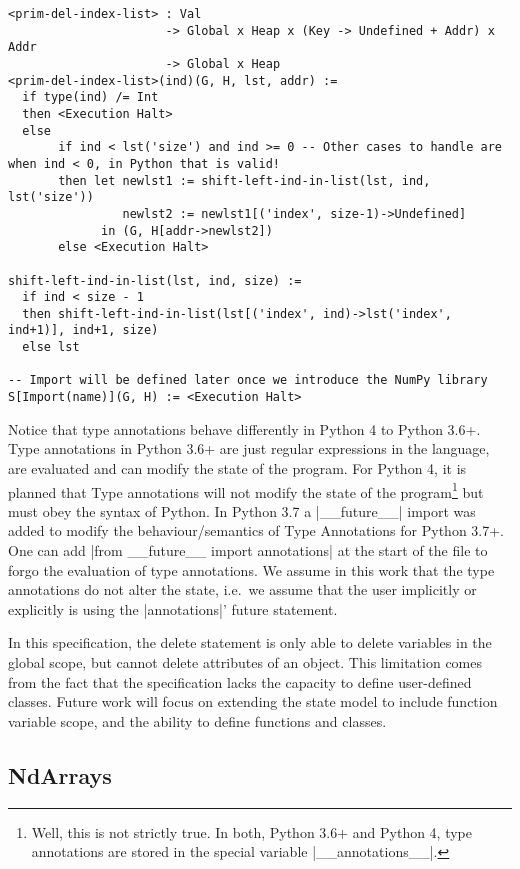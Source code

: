 \begin{verbatim}
<prim-del-index-list> : Val
                      -> Global x Heap x (Key -> Undefined + Addr) x Addr
                      -> Global x Heap
<prim-del-index-list>(ind)(G, H, lst, addr) :=
  if type(ind) /= Int
  then <Execution Halt>
  else
       if ind < lst('size') and ind >= 0 -- Other cases to handle are when ind < 0, in Python that is valid!
       then let newlst1 := shift-left-ind-in-list(lst, ind, lst('size'))
                newlst2 := newlst1[('index', size-1)->Undefined]
             in (G, H[addr->newlst2])
       else <Execution Halt>

shift-left-ind-in-list(lst, ind, size) :=
  if ind < size - 1
  then shift-left-ind-in-list(lst[('index', ind)->lst('index', ind+1)], ind+1, size)
  else lst

-- Import will be defined later once we introduce the NumPy library
S[Import(name)](G, H) := <Execution Halt>
\end{verbatim}

Notice that type annotations behave differently in Python 4 to Python
3.6+. Type annotations in Python 3.6+ are just regular expressions in
the language, are evaluated and can modify the state of the program. For
Python 4, it is planned that Type annotations will not modify the state
of the program\footnote{Well, this is not strictly true. In both, Python
  3.6+ and Python 4, type annotations are stored in the special variable
  \pycode|__annotations__|.
}
but must obey the syntax of Python.
In Python 3.7 a \pycode|__future__| import was added to
modify the behaviour/semantics of Type Annotations for Python 3.7+. One
can add \pycode|from __future__ import annotations|
at the start of the file to forgo the evaluation of type annotations. We
assume in this work that the type annotations do not alter the state,
i.e.~we assume that the user implicitly or explicitly is using the
\pycode|annotations|' future statement.

In this specification, the delete statement is only able to delete
variables in the global scope, but cannot delete attributes of an
object. This limitation comes from the fact that the specification
lacks the capacity to define user-defined classes. Future work will
focus on extending the state model to include function variable scope,
and the ability to define functions and classes.

\subsection{NdArrays}\label{ndarrays}

